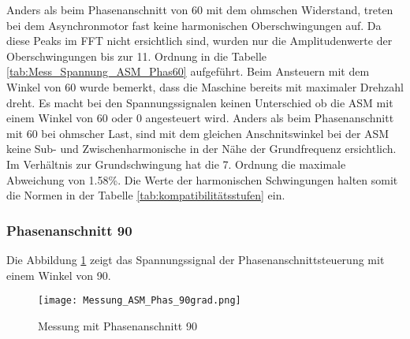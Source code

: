 Anders als beim Phasenanschnitt von 60\textdegree\hspace{0.02cm} mit dem ohmschen Widerstand, treten bei dem Asynchronmotor fast keine harmonischen Oberschwingungen auf. Da diese Peaks im FFT nicht ersichtlich sind, wurden nur die Amplitudenwerte der Oberschwingungen bis zur 11. Ordnung in die Tabelle \ref{tab:Mess_Spannung_ASM_Phas60} aufgeführt. 
Beim Ansteuern mit dem Winkel von 60\textdegree \hspace{0.02cm} wurde bemerkt, dass die Maschine bereits mit maximaler Drehzahl dreht. Es macht bei den Spannungssignalen keinen Unterschied ob die ASM mit einem Winkel von 60\textdegree \hspace{0.02cm} oder 0\textdegree \hspace{0.02cm} angesteuert wird. Anders als beim Phasenanschnitt mit 60\textdegree\hspace{0.02cm} bei ohmscher Last, sind mit dem gleichen Anschnitswinkel bei der ASM keine Sub- und Zwischenharmonische in der Nähe der Grundfrequenz ersichtlich. Im Verhältnis zur Grundschwingung hat die 7. Ordnung die maximale Abweichung von 1.58\%. Die Werte der harmonischen Schwingungen halten somit die Normen in der Tabelle \ref{tab:kompatibilitätsstufen} ein. 

\newpage
\subsubsection*{Phasenanschnitt 90\textdegree}
Die Abbildung \ref{fig:Mess_ASM_Phas90} zeigt das Spannungssignal der Phasenanschnittsteuerung mit einem Winkel von 90\textdegree.

\begin{figure}[ht!]
	\centering
	\texttt{[image: Messung\_ASM\_Phas\_90grad.png]}	
	\caption{Messung mit Phasenanschnitt 90\textdegree}\label{fig:Mess_ASM_Phas90}
\end{figure}


